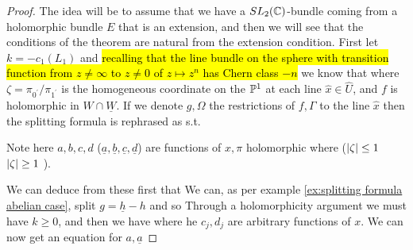 \documentclass{article}
\begin{document}
\begin{proof}
	The idea will be to assume that we have a $SL_2(\mathbb{C})$-bundle coming from a holomorphic bundle $E$ that is an extension, and then we will see that the conditions of the theorem are natural from the extension condition. First let $k = -c_1(L_1)$ and \hl{recalling that the line bundle on the sphere with transition function from $z \neq \infty$ to $z \neq 0$ of $z \mapsto z^n$ has Chern class $-n$} we know that 
	where $\zeta = \pi_{0^\prime}/\pi_{1^\prime}$ is the homogeneous coordinate on the $\mathbb{P}^1$ at each line $\hat{x} \in \hat{U}$, and $f$ is holomorphic in $W \cap \underline{W}$. If we denote $g,\Omega$ the restrictions of $f,\Gamma$ to the line $\hat{x}$ then the splitting formula is rephrased as 
	s.t. 
\begin{remark}
	Note here $a,b,c,d$ ($\underline{a},\underline{b},\underline{c},\underline{d}$) are functions of $x,\pi$ holomorphic where ($\left\lvert \zeta \right\rvert\leq 1$ $\left\lvert \zeta \right\rvert\geq1$ ).
\end{remark}
We can deduce from these first that 
We can, as per example \ref{ex:splitting formula abelian case}, split $g=\underline{h}-h$ and so 
Through a holomorphicity argument we must have $k\geq 0$, and then we have 
where he $c_j,d_j$ are arbitrary functions of $x$. We can now get an equation for $a,\underline{a}$ 
\end{proof}
\end{document}
